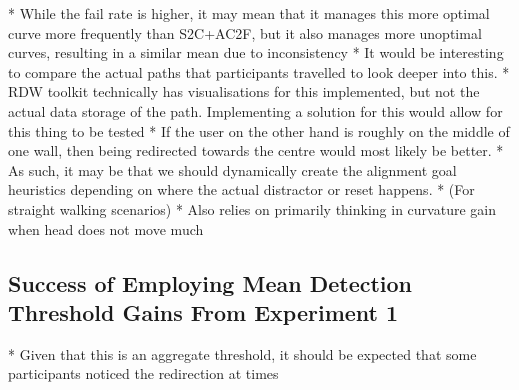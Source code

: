       * While the fail rate is higher, it may mean that it manages this more optimal curve more frequently than S2C+AC2F, but it also manages more unoptimal curves, resulting in a similar mean due to inconsistency
      * It would be interesting to compare the actual paths that participants travelled to look deeper into this.
         * RDW toolkit technically has visualisations for this implemented, but not the actual data storage of the path. Implementing a solution for this would allow for this thing to be tested
      * If the user on the other hand is roughly on the middle of one wall, then being redirected towards the centre would most likely be better.
      * As such, it may be that we should dynamically create the alignment goal heuristics depending on where the actual distractor or reset happens. 
        * (For straight walking scenarios)
        * Also relies on primarily thinking in curvature gain when head does not move much

\subsection{Success of Employing Mean Detection Threshold Gains From Experiment 1}
* Given that this is an aggregate threshold, it should be expected that some participants noticed the redirection at times